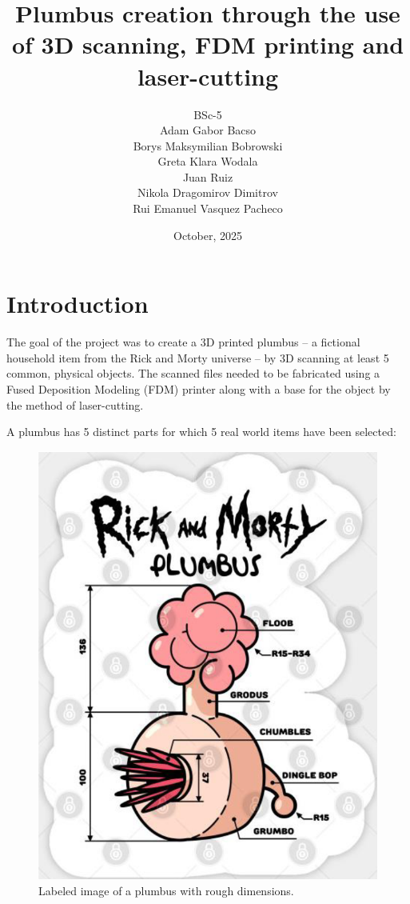 \documentclass[12pt,a4paper]{article}
\begin{document}
\title{Plumbus creation through the use of 3D scanning, FDM printing and
laser-cutting}

\author{
  BSc-5 \\[1em]
  Adam Gabor Bacso \\
  Borys Maksymilian Bobrowski \\
  Greta Klara Wodala \\
  Juan Ruiz \\
  Nikola Dragomirov Dimitrov \\
  Rui Emanuel Vasquez Pacheco
}

\date{October, 2025}
\maketitle
\tableofcontents
\newpage

\section{Introduction}

The goal of the project was to create a 3D printed plumbus -- a fictional
household item from the Rick and Morty universe -- by 3D scanning at least 5
common, physical objects. The scanned files needed to be fabricated using a
Fused Deposition Modeling (FDM) printer along with a base for the object by the
method of laser-cutting.

A plumbus has 5 distinct parts for which 5 real world items have been selected:

\begin{figure}[h]
  \begin{center}
    \includegraphics[width=0.4\linewidth]{media/plumbus_drawing.png}
  \end{center}
  \caption{Labeled image of a plumbus with rough dimensions.}
\end{figure}
\end{document}
